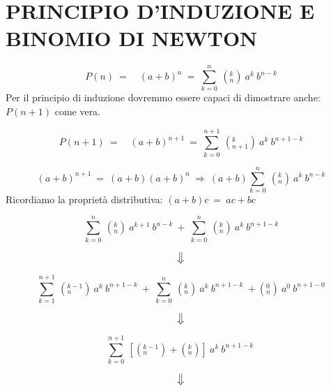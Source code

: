 


\maketitle

\section{PRINCIPIO D'INDUZIONE E BINOMIO DI NEWTON}
\begin{dimo}
	
	\begin{equation}
	P(n)\ =\quad (a+b)^n\ =\ \sum_{k=0}^{n}\ (_{n}^{k})\ a^k\ b^{n-k}
	\end{equation}
Per il principio di induzione dovremmo essere capaci di dimostrare anche: 
$P(n+1)$ come vera.

	\begin{equation}
	P(n+1)\ =\quad (a+b)^{n+1}\ =\ 
	\sum_{k=0}^{n+1}\ (_{n+1}^{k})\ a^k\ b^{n+1-k} 
	\end{equation}

	\begin{equation}
	(a+b)^{n+1}\ =\ (a+b)(a+b)^n\ \Rightarrow\ 
	(a+b)\sum_{k=0}^{n}\ (_{n}^{k})\ a^k\ b^{n-k}
	\end{equation}
Ricordiamo la proprietà distributiva: $(a+b)c\ =\ ac + bc$

	\begin{equation}
	\sum_{k=0}^{n}\ (_{n}^{k})\ a^{k+1}\ b^{n-k}\ +\ 
	\sum_{k=0}^{n}\ (_{n}^{k})\ a^k\ b^{n+1-k}
	\end{equation}

	\begin{equation} 
	\big\Downarrow
	\end{equation}

	\begin{equation}
	\sum_{k=1}^{n+1}\ (_{n}^{k-1})\ a^{k}\ b^{n+1-k}\ + \ 
	\sum_{k=0}^{n}\ (_{n}^{k})\ a^k\ b^{n+1-k}\ + (_{n}^{0})\ a^0\ b^{n+1-0}
	\end{equation}

	\begin{equation} 
	\big\Downarrow
	\end{equation}
	
	\begin{equation}
	\sum_{k=0}^{n+1}\ [(_{n}^{k-1}) + (_{n}^{k})]\ a^{k}\ b^{n+1-k}\
	\end{equation}
	
	\begin{equation}
	\big\Downarrow
	\end{equation}
	

\end{dimo}

